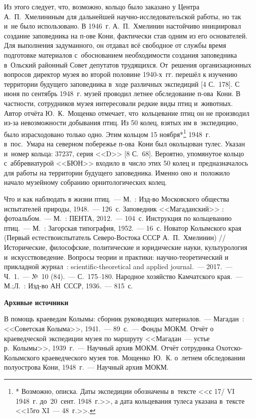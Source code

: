 Из этого следует, что, возможно, кольцо было заказано у Центра А.~П.~Хмелининым для дальнейшей научно-исследовательской работы, но так и~не было использовано. В 1946~г. А.~П.~Хмелинин настойчиво инициировал создание заповедника на п-ове Кони, фактически став одним из его основателей. Для выполнения задуманного, он отдавал всё свободное от службы время подготовке материалов с~обоснованием необходимости создания заповедника в~Ольский районный Совет депутатов трудящихся. От~решения организационных вопросов директор музея во второй половине 1940-х~гг. перешёл к изучению территории будущего заповедника в~ходе различных экспедиций [4 С.~178]. С июня по сентябрь 1948~г. музей проводил летнее обследование п-ова~Кони. В частности, сотрудников музея интересовали редкие виды птиц и~животных. Автор отчёта Ю.~К.~Мощенко отмечает, что~кольцевание птиц он не производил из-за невозможности добывания птиц. Из 50 колец, взятых им в~экспедицию, было израсходовано только одно. Этим кольцом 15 ноября*\footnote{* Возможно, описка.  Даты экспедиции обозначены в~тексте <<с 17/ VI 1948~г. до~20~сент. 1948~г.>>, а дата кольцевания тулеса указана в~тексте <<15го XI~--- 48~г.>>.} 1948~г. в~пос.~Умара на северном побережье п-ова~Кони был окольцован тулес. Указан и~номер кольца: 37237, серия <<D>> [8 С.~68]. Вероятно, упомянутое кольцо с~аббревиатурой <<БЮН>> входило в~число этих 50 колец и~предназначалось для работы на территории будущего заповедника. Именно оно и~положило начало музейному собранию орнитологических колец.

\begin{thebibliography}{99}

\bibitem{} Что и как наблюдать в жизни птиц.~--- М.~: Изд-во Московского общества испытателей природы, 1948.~--- 126~с.
\bibitem{}Заповедник <<Магаданский>> : фотоальбом.~--- М.~: ПЕНТА, 2012.~--- 104~с.
\bibitem{}Инструкция по кольцеванию птиц.~--- М.~: Загорская типография, 1952.~--- 16~с.
\bibitem{}Новатор Колымского края (Первый естествоиспытатель Северо-Востока СССР А.~П.~Хмелинин) // Исторические, философские, политические и юридические науки, культурология и~искусствоведение. Вопросы теории и практики: научно-теоретический и прикладной журнал~: scientific-theoretical and applied journal.~--- 2017.~--- Ч.~1.~--- №~10 (84).~--- С.~175--180.
\bibitem{} Народное хозяйство Камчатского края.~--- М.;Л.~: Изд-во АН~СССР, 1936.~--- 815~с.

\textbf{Архивые источники}

\bibitem{}В помощь краеведам Колымы: сборник руководящих материалов.~--- Магадан~: <<Советская Колыма>>, 1941.~--- 89~с.~--- Фонды МОКМ.
\bibitem{}Отчёт о краеведческой экспедиции музея по маршруту <<Магадан~--- устье р.~Колымы>>, 1939~г.~--- Научный архив МОКМ.
\bibitem{}Отчёт сотрудника Охотско-Колымского краеведческого музея тов. Мощенко~Ю.~К. о~летнем обследовании полуострова Кони, 1948~г.~--- Научный архив МОКМ.


\end{thebibliography}

